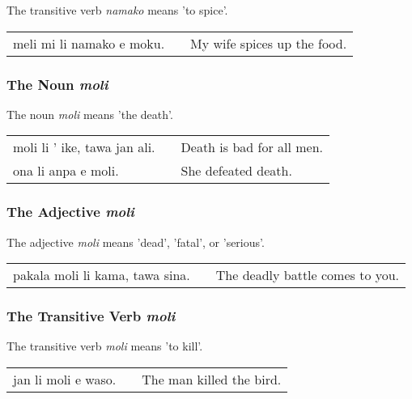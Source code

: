 The transitive verb \textit{namako} means 'to spice'. 

\begin{supertabular}{p{5,5cm}|ll}
meli mi li namako e moku. &&  My wife spices up the food. \\
\end{supertabular}

%
%
\subsubsection*{The Noun \textit{moli}}
%
%

The noun \textit{moli} means 'the death'.

\begin{supertabular}{p{5,5cm}|ll}
moli li ' ike, tawa jan ali. && Death is bad for all men. \\
ona li anpa e moli. && She defeated death.  \\
\end{supertabular} 

%
%
\subsubsection*{The Adjective \textit{moli}}
%
%

The adjective \textit{moli} means 'dead', 'fatal', or 'serious'. 

\begin{supertabular}{p{5,5cm}|ll}
pakala moli li kama, tawa sina. && The deadly battle comes to you. \\
\end{supertabular} 

%
%
\subsubsection*{The Transitive Verb \textit{moli}}
%
%
The transitive verb \textit{moli} means 'to kill'.

\begin{supertabular}{p{5,5cm}|ll}
jan li moli e waso. && The man killed the bird. \\
\end{supertabular} 

